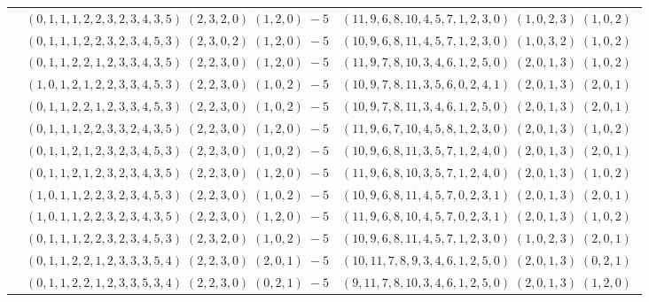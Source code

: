 \documentclass[11pt]{article}
\begin{document}
\begin{longtable}[l]{|c|c|c|}
 \cline{2-3} 
 & $(0 ,1 ,1 ,1 ,2 ,2 ,3 ,2 ,3 ,4 ,3 ,5) \;(2 ,3 ,2 ,0) \;(1 ,2 ,0) \;-5$ & $(11 ,9 ,6 ,8 ,10 ,4 ,5 ,7 ,1 ,2 ,3 ,0) \;(1 ,0 ,2 ,3) \;(1 ,0 ,2) \;$\\ 
 \cline{2-3} 
 & $(0 ,1 ,1 ,1 ,2 ,2 ,3 ,2 ,3 ,4 ,5 ,3) \;(2 ,3 ,0 ,2) \;(1 ,2 ,0) \;-5$ & $(10 ,9 ,6 ,8 ,11 ,4 ,5 ,7 ,1 ,2 ,3 ,0) \;(1 ,0 ,3 ,2) \;(1 ,0 ,2) \;$\\ 
 \cline{2-3} 
 & $(0 ,1 ,1 ,2 ,2 ,1 ,2 ,3 ,3 ,4 ,3 ,5) \;(2 ,2 ,3 ,0) \;(1 ,2 ,0) \;-5$ & $(11 ,9 ,7 ,8 ,10 ,3 ,4 ,6 ,1 ,2 ,5 ,0) \;(2 ,0 ,1 ,3) \;(1 ,0 ,2) \;$\\ 
 \cline{2-3} 
 & $(1 ,0 ,1 ,2 ,1 ,2 ,2 ,3 ,3 ,4 ,5 ,3) \;(2 ,2 ,3 ,0) \;(1 ,0 ,2) \;-5$ & $(10 ,9 ,7 ,8 ,11 ,3 ,5 ,6 ,0 ,2 ,4 ,1) \;(2 ,0 ,1 ,3) \;(2 ,0 ,1) \;$\\ 
 \cline{2-3} 
 & $(0 ,1 ,1 ,2 ,2 ,1 ,2 ,3 ,3 ,4 ,5 ,3) \;(2 ,2 ,3 ,0) \;(1 ,0 ,2) \;-5$ & $(10 ,9 ,7 ,8 ,11 ,3 ,4 ,6 ,1 ,2 ,5 ,0) \;(2 ,0 ,1 ,3) \;(2 ,0 ,1) \;$\\ 
 \cline{2-3} 
 & $(0 ,1 ,1 ,1 ,2 ,2 ,3 ,3 ,2 ,4 ,3 ,5) \;(2 ,2 ,3 ,0) \;(1 ,2 ,0) \;-5$ & $(11 ,9 ,6 ,7 ,10 ,4 ,5 ,8 ,1 ,2 ,3 ,0) \;(2 ,0 ,1 ,3) \;(1 ,0 ,2) \;$\\ 
 \cline{2-3} 
 & $(0 ,1 ,1 ,2 ,1 ,2 ,3 ,2 ,3 ,4 ,5 ,3) \;(2 ,2 ,3 ,0) \;(1 ,0 ,2) \;-5$ & $(10 ,9 ,6 ,8 ,11 ,3 ,5 ,7 ,1 ,2 ,4 ,0) \;(2 ,0 ,1 ,3) \;(2 ,0 ,1) \;$\\ 
 \cline{2-3} 
 & $(0 ,1 ,1 ,2 ,1 ,2 ,3 ,2 ,3 ,4 ,3 ,5) \;(2 ,2 ,3 ,0) \;(1 ,2 ,0) \;-5$ & $(11 ,9 ,6 ,8 ,10 ,3 ,5 ,7 ,1 ,2 ,4 ,0) \;(2 ,0 ,1 ,3) \;(1 ,0 ,2) \;$\\ 
 \cline{2-3} 
 & $(1 ,0 ,1 ,1 ,2 ,2 ,3 ,2 ,3 ,4 ,5 ,3) \;(2 ,2 ,3 ,0) \;(1 ,0 ,2) \;-5$ & $(10 ,9 ,6 ,8 ,11 ,4 ,5 ,7 ,0 ,2 ,3 ,1) \;(2 ,0 ,1 ,3) \;(2 ,0 ,1) \;$\\ 
 \cline{2-3} 
 & $(1 ,0 ,1 ,1 ,2 ,2 ,3 ,2 ,3 ,4 ,3 ,5) \;(2 ,2 ,3 ,0) \;(1 ,2 ,0) \;-5$ & $(11 ,9 ,6 ,8 ,10 ,4 ,5 ,7 ,0 ,2 ,3 ,1) \;(2 ,0 ,1 ,3) \;(1 ,0 ,2) \;$\\ 
 \cline{2-3} 
 & $(0 ,1 ,1 ,1 ,2 ,2 ,3 ,2 ,3 ,4 ,5 ,3) \;(2 ,3 ,2 ,0) \;(1 ,0 ,2) \;-5$ & $(10 ,9 ,6 ,8 ,11 ,4 ,5 ,7 ,1 ,2 ,3 ,0) \;(1 ,0 ,2 ,3) \;(2 ,0 ,1) \;$\\ 
 \cline{2-3} 
 & $(0 ,1 ,1 ,2 ,2 ,1 ,2 ,3 ,3 ,3 ,5 ,4) \;(2 ,2 ,3 ,0) \;(2 ,0 ,1) \;-5$ & $(10 ,11 ,7 ,8 ,9 ,3 ,4 ,6 ,1 ,2 ,5 ,0) \;(2 ,0 ,1 ,3) \;(0 ,2 ,1) \;$\\ 
 \cline{2-3} 
 & $(0 ,1 ,1 ,2 ,2 ,1 ,2 ,3 ,3 ,5 ,3 ,4) \;(2 ,2 ,3 ,0) \;(0 ,2 ,1) \;-5$ & $(9 ,11 ,7 ,8 ,10 ,3 ,4 ,6 ,1 ,2 ,5 ,0) \;(2 ,0 ,1 ,3) \;(1 ,2 ,0) \;$\\ 

\end{longtable}
\end{document}
